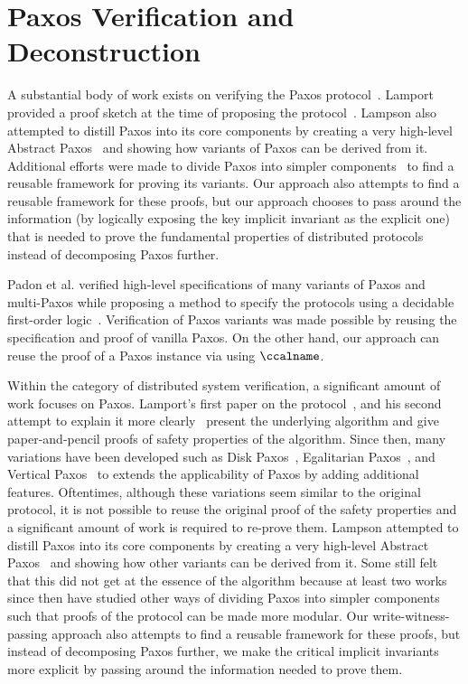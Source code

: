 \section{Paxos Verification and Deconstruction}
\label{chatper:related:sec:paxos-verification-and-decomposition}

A substantial body of work exists on verifying the Paxos protocol~\cite{paxos}.
Lamport provided a proof sketch at the time of proposing the protocol~\cite{paxosmadesimple}.
Lampson also attempted to distill Paxos into its core components by creating a very
high-level Abstract Paxos~\cite{Lampson2001} and showing how variants of
Paxos can be derived from it. 
Additional efforts were made to divide Paxos
into simpler components~\cite{dpaxos, sdpaxos} to find a reusable framework for
proving its variants. Our approach also attempts
to find a reusable framework for these proofs,
but our approach chooses to pass around the information (by logically exposing the key implicit invariant as the explicit one)
 that is needed to prove the fundamental properties of distributed protocols instead of decomposing Paxos further. 

Padon et al. verified high-level specifications of many variants of Paxos
and multi-Paxos while proposing a method to specify the protocols using
a decidable first-order logic~\cite{paxosepr}. Verification of Paxos
variants was made possible by reusing the specification and proof of vanilla
Paxos. 
On the other hand, our approach can reuse the proof of a Paxos instance
via using $\ccalname$. 


Within the category of distributed system verification,
a significant amount of work focuses on Paxos.
Lamport's first paper on the protocol~\cite{paxos}, and his second attempt to explain it more clearly~\cite{paxosmadesimple}
present the underlying algorithm and give paper-and-pencil proofs of safety properties of the algorithm.
Since then, many variations have been developed such as Disk Paxos~\cite{diskpaxos}, Egalitarian Paxos~\cite{epaxos},
and Vertical Paxos~\cite{vertpaxos} to extends the applicability of Paxos by adding additional features. 
Oftentimes, although these variations seem similar to the original protocol, 
it is not possible to reuse the original
proof of the safety properties and a significant amount of work is required to re-prove them.
Lampson attempted to distill Paxos into its core components by creating a very high-level Abstract Paxos~\cite{Lampson2001}
and showing how other variants can be derived from it.
Some still felt that this did not get at the essence of the algorithm because at least two works since then \cite{dpaxos, sdpaxos}
have studied other ways of dividing Paxos into simpler components such that  proofs of the protocol can be made more modular.
Our write-witness-passing approach also attempts to find a reusable framework for these proofs,
but instead of decomposing Paxos further, we make the critical implicit invariants more explicit by passing around
the information needed to prove them.

